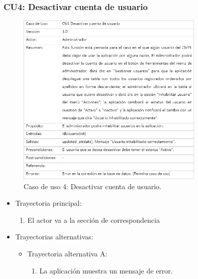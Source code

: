 		\subsubsection{CU4: Desactivar cuenta de usuario}
			\begin{figure}[htbp!]
				\centering
					\includegraphics[width=0.8\textwidth]{images/CU/CU4}
					\caption{Caso de uso 4: Desactivar cuenta de usuario.}
				\label{Tabla}
			\end{figure}
			
			\begin{itemize}
				\item Trayectoria principal:
					\begin{enumerate}
						\item El actor va a la sección de correspondencia 
					\end{enumerate}
				\item Trayectorias alternativas:
					\begin{itemize}
						\item Trayectoria alternativa A:
							\begin{enumerate}
								\item La aplicación muestra un mensaje de error.
							\end{enumerate}
					\end{itemize}
			\end{itemize}
			
